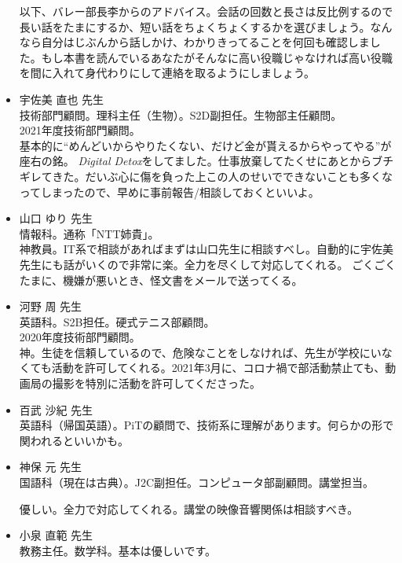 \documentclass[a4paper]{ltjsreport}
\begin{document}
\begin{itemize}
        以下、バレー部長李からのアドバイス。会話の回数と長さは反比例するので長い話をたまにするか、短い話をちょくちょくするかを選びましょう。なんなら自分はじぶんから話しかけ、わかりきってることを何回も確認しました。もし本書を読んでいるあなたがそんなに高い役職じゃなければ高い役職を間に入れて身代わりにして連絡を取るようにしましょう。

  \item 宇佐美 直也 先生\\
        技術部門顧問。理科主任（生物）。S2D副担任。生物部主任顧問。\\
        2021年度技術部門顧問。\\
        基本的に``めんどいからやりたくない、だけど金が貰えるからやってやる''が座右の銘。
        \textit{Digital Detox}をしてました。仕事放棄してたくせにあとからブチギレてきた。だいぶ心に傷を負った上この人のせいでできないことも多くなってしまったので、早めに事前報告/相談しておくといいよ。
  \item 山口 ゆり 先生\\
        情報科。通称「NTT姉貴」。\\
        神教員。IT系で相談があればまずは山口先生に相談すべし。自動的に宇佐美先生にも話がいくので非常に楽。全力を尽くして対応してくれる。
        ごくごくたまに、機嫌が悪いとき、怪文書をメールで送ってくる。

  \item 河野 周 先生\\
        英語科。S2B担任。硬式テニス部顧問。\\
        2020年度技術部門顧問。\\
        神。生徒を信頼しているので、危険なことをしなければ、先生が学校にいなくても活動を許可してくれる。2021年3月に、コロナ禍で部活動禁止ても、動画局の撮影を特別に活動を許可してくださった。

  \item 百武 沙紀 先生\\
        英語科（帰国英語）。PiTの顧問で、技術系に理解があります。何らかの形で関われるといいかも。

  \item 神保 元 先生\\
        国語科（現在は古典）。J2C副担任。コンピュータ部副顧問。講堂担当。

        優しい。全力で対応してくれる。講堂の映像音響関係は相談すべき。

  \item 小泉 直範 先生\\
        教務主任。数学科。基本は優しいです。


\end{itemize}
\end{document}
